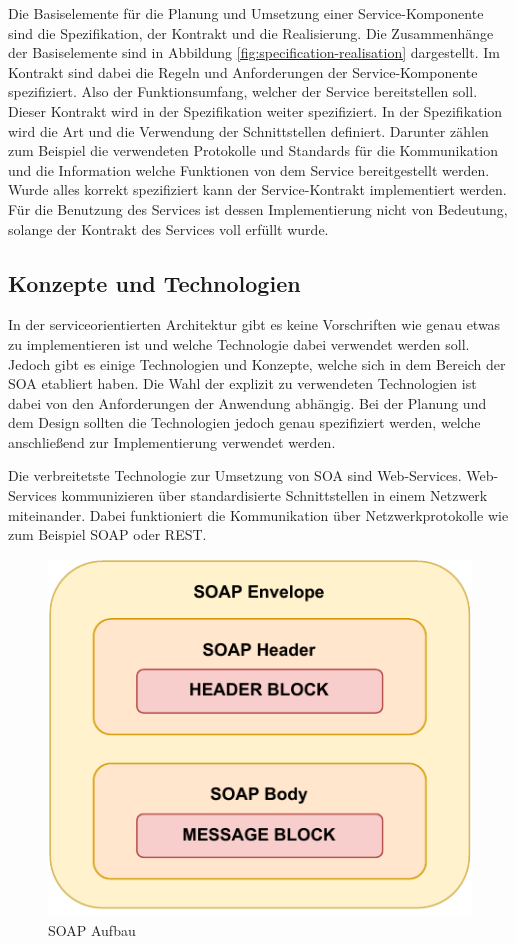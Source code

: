 Die Basiselemente für die Planung und Umsetzung einer Service-Komponente sind die Spezifikation, der Kontrakt und die Realisierung. Die Zusammenhänge der Basiselemente sind in Abbildung \ref{fig:specification-realisation} dargestellt. Im Kontrakt sind dabei die Regeln und Anforderungen der Service-Komponente spezifiziert. Also der Funktionsumfang, welcher der Service bereitstellen soll. Dieser Kontrakt wird in der Spezifikation weiter spezifiziert. In der Spezifikation wird die Art und die Verwendung der Schnittstellen definiert. Darunter zählen zum Beispiel die verwendeten Protokolle und Standards für die Kommunikation und die Information welche Funktionen von dem Service bereitgestellt werden. Wurde alles korrekt spezifiziert kann der Service-Kontrakt implementiert werden. Für die Benutzung des Services ist dessen Implementierung nicht von Bedeutung, solange der Kontrakt des Services voll erfüllt wurde. \cite{Stojanovic.op.2004}

\subsection{Konzepte und Technologien}
\label{sec:conceptsAndTechnologies}

In der serviceorientierten Architektur gibt es keine Vorschriften wie genau etwas zu implementieren ist und welche Technologie dabei verwendet werden soll. Jedoch gibt es einige Technologien und Konzepte, welche sich in dem Bereich der SOA etabliert haben. Die Wahl der explizit zu verwendeten Technologien ist dabei von den Anforderungen der Anwendung abhängig. Bei der Planung und dem Design sollten die Technologien jedoch genau spezifiziert werden, welche anschließend zur Implementierung verwendet werden.

Die verbreitetste Technologie zur Umsetzung von SOA sind Web-Services. Web-Services kommunizieren über standardisierte Schnittstellen in einem Netzwerk miteinander. Dabei funktioniert die Kommunikation über Netzwerkprotokolle wie zum Beispiel SOAP oder REST. \cite{Heutschi.2007}

\begin{figure}[H]
    \centering
    \includegraphics[width=.5\textwidth]{images/SOAP.drawio.pdf}
    \caption{SOAP Aufbau \cite{AlexanderS.Gillis.02.12.2022}}
    \label{fig:soap}
\end{figure}


